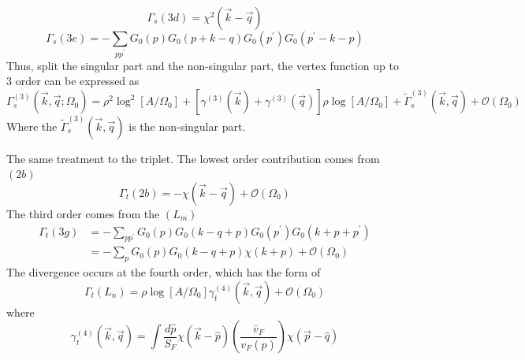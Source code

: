 \documentclass[12pt]{article}
\numberwithin{equation}{section}
\begin{document}
		\begin{equation}
			\Gamma_{s}(3 d)=\chi^{2}(\vec{k}-\vec{q})
			\end{equation}
			\begin{equation}
				\Gamma_{s}(3 e)=-\sum_{p p^{\prime}} G_{0}(p) G_{0}(p+k-q) G_{0}\left(p^{\prime}\right) G_{0}\left(p^{\prime}-k-p\right)
				\end{equation}
Thus, split the singular part and the non-singular part, the vertex function up to 3 order can be expressed as
\begin{equation}
	\Gamma_{s}^{(3)}\left(\vec{k}, \vec{q} ; \Omega_{0}\right)=\rho^{2} \log ^{2}\left[A / \Omega_{0}\right]+\left[\gamma^{(3)}(\vec{k})+\gamma^{(3)}(\vec{q})\right] \rho \log \left[A / \Omega_{0}\right]+\tilde{\Gamma}_{s}^{(3)}(\vec{k}, \vec{q})+\mathcal{O}\left(\Omega_{0}\right)
	\end{equation}
Where the $\tilde{\Gamma}_{s}^{(3)}(\vec{k}, \vec{q})$ is the non-singular part.\par 
The same treatment to the triplet.
The lowest order contribution comes from $(2b)$
	\begin{equation}
	  \Gamma_{t}(2b)=-\chi(\vec{k}-\vec{q})+\mathcal{O}(\Omega_0)
		\end{equation}
The third order comes from the $(L_m)$
			\begin{equation}
				\begin{aligned}
				\Gamma_{t}(3 g) &=-\sum_{p p^{\prime}} G_{0}(p) G_{0}(k-q+p) G_{0}\left(p^{\prime}\right) G_{0}\left(k+p+p^{\prime}\right) \\
				&=-\sum_{p} G_{0}(p) G_{0}(k-q+p) \chi(k+p)+\mathcal{O}(\Omega_0)
				\end{aligned}
				\end{equation}
The divergence occurs at the fourth order, which has the form of
\begin{equation}
	\Gamma_{t}\left(L_{n}\right)=\rho \log \left[A / \Omega_{0}\right] \gamma_{t}^{(4)}(\vec{k}, \vec{q})+\mathcal{O}\left(\Omega_{0}\right)
	\end{equation}
where
\begin{equation}
	\gamma_{t}^{(4)}(\vec{k}, \vec{q})=\int \frac{d \hat{p}}{S_{F}} \chi(\vec{k}-\hat{p})\left(\frac{\bar{v}_{F}}{v_{F}(\hat{p})}\right) \chi(\vec{p}-\hat{q})
	\end{equation}
\end{document}
